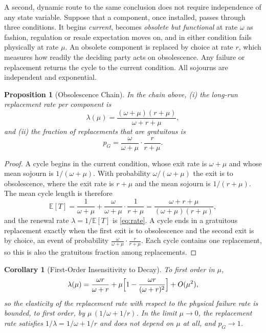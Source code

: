 \documentclass[11pt]{article}
\newtheorem{proposition}[theorem]{Proposition}
\newtheorem{corollary}[theorem]{Corollary}
\theoremstyle{definition}
\theoremstyle{remark}
\newcommand{\E}{\mathbb{E}}
\begin{document}
A second, dynamic route to the same conclusion does not require independence of any state variable. Suppose that a component, once installed, passes through three conditions. It begins \emph{current}, becomes \emph{obsolete but functional} at rate $\omega$ as fashion, regulation or resale expectation moves on, and in either condition fails physically at rate $\mu$. An obsolete component is replaced by choice at rate $r$, which measures how readily the deciding party acts on obsolescence. Any failure or replacement returns the cycle to the current condition. All sojourns are independent and exponential.

\begin{proposition}[Obsolescence Chain]\label{prop:chain}
In the chain above, (i) the long-run replacement rate per component is
\begin{equation}\label{eq:rate}
\lambda(\mu) = \frac{(\omega+\mu)(r+\mu)}{\omega+r+\mu},
\end{equation}
and (ii) the fraction of replacements that are gratuitous is
\begin{equation}\label{eq:pg}
p_G = \frac{\omega}{\omega+\mu}\cdot\frac{r}{r+\mu}.
\end{equation}
\end{proposition}

\begin{proof}
A cycle begins in the current condition, whose exit rate is $\omega+\mu$ and whose mean sojourn is $1/(\omega+\mu)$. With probability $\omega/(\omega+\mu)$ the exit is to obsolescence, where the exit rate is $r+\mu$ and the mean sojourn is $1/(r+\mu)$. The mean cycle length is therefore
\[
\E[T] = \frac{1}{\omega+\mu} + \frac{\omega}{\omega+\mu}\cdot\frac{1}{r+\mu} = \frac{\omega+r+\mu}{(\omega+\mu)(r+\mu)},
\]
and the renewal rate $\lambda = 1/\E[T]$ is \eqref{eq:rate}. A cycle ends in a gratuitous replacement exactly when the first exit is to obsolescence and the second exit is by choice, an event of probability $\frac{\omega}{\omega+\mu}\cdot\frac{r}{r+\mu}$. Each cycle contains one replacement, so this is also the gratuitous fraction among replacements.
\end{proof}

\begin{corollary}[First-Order Insensitivity to Decay]\label{cor:insens}
To first order in $\mu$,
\[
\lambda(\mu) = \frac{\omega r}{\omega+r} + \mu\Bigl[1 - \frac{\omega r}{(\omega+r)^2}\Bigr] + O(\mu^2),
\]
so the elasticity of the replacement rate with respect to the physical failure rate is bounded, to first order, by $\mu\,(1/\omega + 1/r)$. In the limit $\mu\to0$, the replacement rate satisfies $1/\lambda = 1/\omega + 1/r$ and does not depend on $\mu$ at all, and $p_G\to1$.
\end{corollary}
\end{document}
